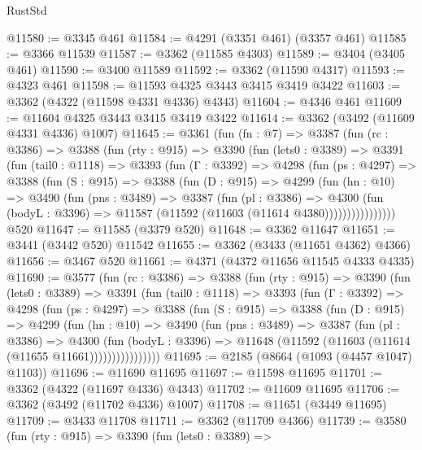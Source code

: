 \begin{lexlean}{RustStd}
\begin{coremodule}
@11580 := @3345 @461
@11584 := @4291 (@3351 @461) (@3357 @461)
@11585 := @3366 @11539
@11587 := @3362 (@11585 @4303)
@11589 := @3404 (@3405 @461)
@11590 := @3400 @11589
@11592 := @3362 (@11590 @4317)
@11593 := @4323 @461
@11598 := @11593 @4325 @3443 @3415 @3419 @3422
@11603 := @3362 (@4322 (@11598 @4331 @4336) @4343)
@11604 := @4346 @461
@11609 := @11604 @4325 @3443 @3415 @3419 @3422
@11614 := @3362 (@3492 (@11609 @4331 @4336) @1007)
@11645 := @3361
    (fun (fn : @7) =>
    @3387
      (fun (rc : @3386) =>
      @3388
        (fun (rty : @915) =>
        @3390
          (fun (lets0 : @3389) =>
          @3391
            (fun (tail0 : @1118) =>
            @3393
              (fun (Γ : @3392) =>
              @4298
                (fun (ps : @4297) =>
                @3388
                  (fun (S : @915) =>
                  @3388
                    (fun (D : @915) =>
                    @4299
                      (fun (hn : @10) =>
                      @3490
                        (fun (pns : @3489) =>
                        @3387
                          (fun (pl : @3386) =>
                          @4300
                            (fun (bodyL : @3396) =>
                            @11587 (@11592 (@11603 (@11614 @4380))))))))))))))))
    @520
@11647 := @11585 (@3379 @520)
@11648 := @3362 @11647
@11651 := @3441 (@3442 @520) @11542
@11655 := @3362 (@3433 (@11651 @4362) @4366)
@11656 := @3467 @520
@11661 := @4371 (@4372 @11656 @11545 @4333 @4335)
@11690 := @3577
    (fun (rc : @3386) =>
    @3388
      (fun (rty : @915) =>
      @3390
        (fun (lets0 : @3389) =>
        @3391
          (fun (tail0 : @1118) =>
          @3393
            (fun (Γ : @3392) =>
            @4298
              (fun (ps : @4297) =>
              @3388
                (fun (S : @915) =>
                @3388
                  (fun (D : @915) =>
                  @4299
                    (fun (hn : @10) =>
                    @3490
                      (fun (pns : @3489) =>
                      @3387
                        (fun (pl : @3386) =>
                        @4300
                          (fun (bodyL : @3396) =>
                          @11648 (@11592 (@11603 (@11614 (@11655 @11661))))))))))))))))
@11695 := @2185 (@8664 (@1093 (@4457 @1047) @1103))
@11696 := @11690 @11695
@11697 := @11598 @11695
@11701 := @3362 (@4322 (@11697 @4336) @4343)
@11702 := @11609 @11695
@11706 := @3362 (@3492 (@11702 @4336) @1007)
@11708 := @11651 (@3449 @11695)
@11709 := @3433 @11708
@11711 := @3362 (@11709 @4366)
@11739 := @3580
    (fun (rty : @915) =>
    @3390
      (fun (lets0 : @3389) =>

\end{coremodule}
\end{lexlean}

